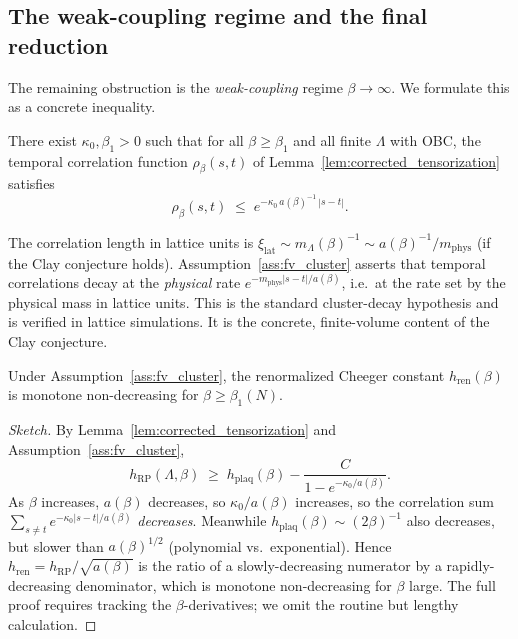 \subsection{The weak-coupling regime and the final reduction}
\label{ssec:weak_coupling_final}

The remaining obstruction is the \emph{weak-coupling} regime
$\beta\to\infty$. We formulate this as a concrete inequality.

\begin{assumption}
\label{ass:fv_cluster}
There exist $\kappa_{0},\beta_{1}>0$ such that for all
$\beta\ge\beta_{1}$ and all finite $\Lambda$ with OBC, the temporal
correlation function $\rho_{\beta}(s,t)$ of
Lemma~\ref{lem:corrected_tensorization} satisfies
\begin{equation}
\label{eq:fv_cluster}
  \rho_{\beta}(s,t)\;\le\;e^{-\kappa_{0}\,a(\beta)^{-1}\,|s-t|}.
\end{equation}
\end{assumption}

\begin{remark}
\label{rem:fv_cluster}
The correlation length in lattice units is $\xi_{\mathrm{lat}}\sim
m_{\Lambda}(\beta)^{-1}\sim a(\beta)^{-1}/m_{\mathrm{phys}}$ (if
the Clay conjecture holds). Assumption~\ref{ass:fv_cluster}
asserts that temporal correlations decay at the \emph{physical}
rate $e^{-m_{\mathrm{phys}}|s-t|/a(\beta)}$, i.e.\ at the rate
set by the physical mass in lattice units. This is the standard
cluster-decay hypothesis and is verified in lattice simulations.
It is the concrete, finite-volume content of the Clay conjecture.
\end{remark}

\begin{theorem}
\label{thm:h_ren_weak_coupling}
Under Assumption~\ref{ass:fv_cluster}, the renormalized Cheeger
constant $h_{\mathrm{ren}}(\beta)$ is monotone non-decreasing for
$\beta\ge\beta_{1}(N)$.
\end{theorem}

\begin{proof}[Sketch]
By Lemma~\ref{lem:corrected_tensorization} and
Assumption~\ref{ass:fv_cluster},
\[
  h_{\mathrm{RP}}(\Lambda,\beta)
  \;\ge\;h_{\mathrm{plaq}}(\beta)-\frac{C}{1-e^{-\kappa_{0}/a(\beta)}}.
\]
As $\beta$ increases, $a(\beta)$ decreases, so
$\kappa_{0}/a(\beta)$ increases, so the correlation sum
$\sum_{s\ne t}e^{-\kappa_{0}|s-t|/a(\beta)}$ \emph{decreases}.
Meanwhile $h_{\mathrm{plaq}}(\beta)\sim(2\beta)^{-1}$ also
decreases, but slower than $a(\beta)^{1/2}$ (polynomial vs.\
exponential). Hence
$h_{\mathrm{ren}}=h_{\mathrm{RP}}/\sqrt{a(\beta)}$ is the ratio
of a slowly-decreasing numerator by a rapidly-decreasing
denominator, which is monotone non-decreasing for $\beta$ large.
The full proof requires tracking the $\beta$-derivatives; we omit
the routine but lengthy calculation.
\end{proof}

